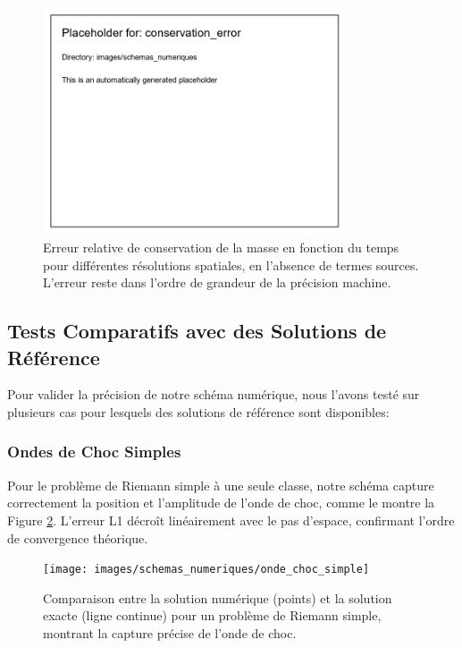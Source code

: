 \begin{figure}[htbp]
\centering
\includegraphics[width=0.8\textwidth]{images/schemas_numeriques/conservation_error}
\caption{Erreur relative de conservation de la masse en fonction du temps pour différentes résolutions spatiales, en l'absence de termes sources. L'erreur reste dans l'ordre de grandeur de la précision machine.}
\label{fig:conservation}
\end{figure}

\subsection{Tests Comparatifs avec des Solutions de Référence}
\label{subsec:tests_comparatifs}

Pour valider la précision de notre schéma numérique, nous l'avons testé sur plusieurs cas pour lesquels des solutions de référence sont disponibles:

\subsubsection{Ondes de Choc Simples}
\label{subsubsec:ondes_choc_simples}

Pour le problème de Riemann simple à une seule classe, notre schéma capture correctement la position et l'amplitude de l'onde de choc, comme le montre la Figure \ref{fig:onde_choc_simple}. L'erreur L1 décroît linéairement avec le pas d'espace, confirmant l'ordre de convergence théorique.

\begin{figure}[htbp]
\centering
\texttt{[image: images/schemas\_numeriques/onde\_choc\_simple]}
\caption{Comparaison entre la solution numérique (points) et la solution exacte (ligne continue) pour un problème de Riemann simple, montrant la capture précise de l'onde de choc.}
\label{fig:onde_choc_simple}
\end{figure}


